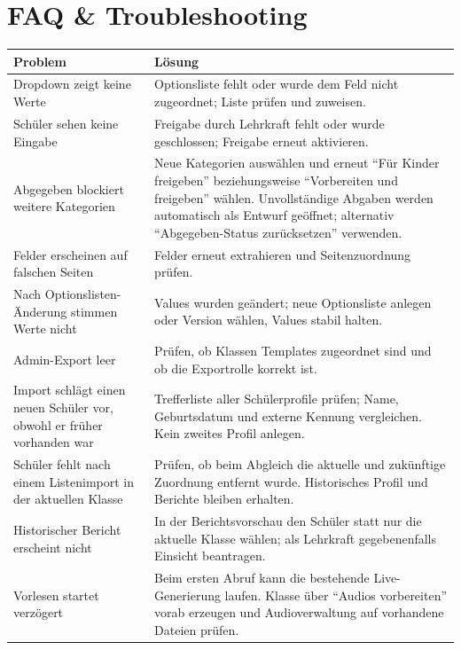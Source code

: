 \documentclass[12pt,a4paper]{article}
\begin{document}
\section{FAQ \& Troubleshooting}
\begin{longtable}{|p{}|p{}|}
\hline
\textbf{Problem} & \textbf{Lösung}\\
\hline
Dropdown zeigt keine Werte & Optionsliste fehlt oder wurde dem Feld nicht zugeordnet; Liste prüfen und zuweisen.\\
\hline
Schüler sehen keine Eingabe & Freigabe durch Lehrkraft fehlt oder wurde geschlossen; Freigabe erneut aktivieren.\\
\hline
Abgegeben blockiert weitere Kategorien & Neue Kategorien auswählen und erneut \enquote{Für Kinder freigeben} beziehungsweise \enquote{Vorbereiten und freigeben} wählen. Unvollständige Abgaben werden automatisch als Entwurf geöffnet; alternativ \enquote{Abgegeben-Status zurücksetzen} verwenden.\\
\hline
Felder erscheinen auf falschen Seiten & Felder erneut extrahieren und Seitenzuordnung prüfen.\\
\hline
Nach Optionslisten-Änderung stimmen Werte nicht & Values wurden geändert; neue Optionsliste anlegen oder Version wählen, Values stabil halten.\\
\hline
Admin-Export leer & Prüfen, ob Klassen Templates zugeordnet sind und ob die Exportrolle korrekt ist.\\
\hline
Import schlägt einen neuen Schüler vor, obwohl er früher vorhanden war & Trefferliste aller Schülerprofile prüfen; Name, Geburtsdatum und externe Kennung vergleichen. Kein zweites Profil anlegen.\\
\hline
Schüler fehlt nach einem Listenimport in der aktuellen Klasse & Prüfen, ob beim Abgleich die aktuelle und zukünftige Zuordnung entfernt wurde. Historisches Profil und Berichte bleiben erhalten.\\
\hline
Historischer Bericht erscheint nicht & In der Berichtsvorschau den Schüler statt nur die aktuelle Klasse wählen; als Lehrkraft gegebenenfalls Einsicht beantragen.\\
\hline
Vorlesen startet verzögert & Beim ersten Abruf kann die bestehende Live-Generierung laufen. Klasse über \enquote{Audios vorbereiten} vorab erzeugen und Audioverwaltung auf vorhandene Dateien prüfen.\\

\end{longtable}
\end{document}
